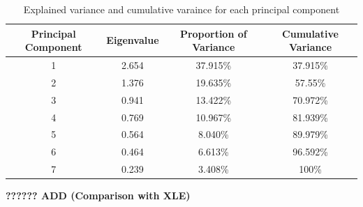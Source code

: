 \documentclass[12pt,twoside]{article}
\newcommand{\head}[1]{\textnormal{\textbf{#1}}}
\begin{document}
\bigbreak
\begin{table}[H]
\begin{tabular}{cccc}
\hline
\head{Principal Component} & \head{Eigenvalue} & \head{Proportion of Variance} & \head{Cumulative Variance}\\
\hline
1 & 2.654 &  37.915\% & 37.915\%\\
2 & 1.376 & 19.635\% & 57.55\%\\
3 & 0.941 &  13.422\% & 70.972\%\\
4 & 0.769 &  10.967\% & 81.939\%\\
5 & 0.564 &  8.040\%  & 89.979\%\\
6 & 0.464 & 6.613\% & 96.592\%\\
7 & 0.239 &  3.408\% & 100\%\\
\hline
\end{tabular}
\caption{Explained variance and cumulative varaince for each principal component}
\end{table}
\bigbreak
\textbf{??????
ADD (Comparison with XLE)}
\bigbreak
\end{document}
